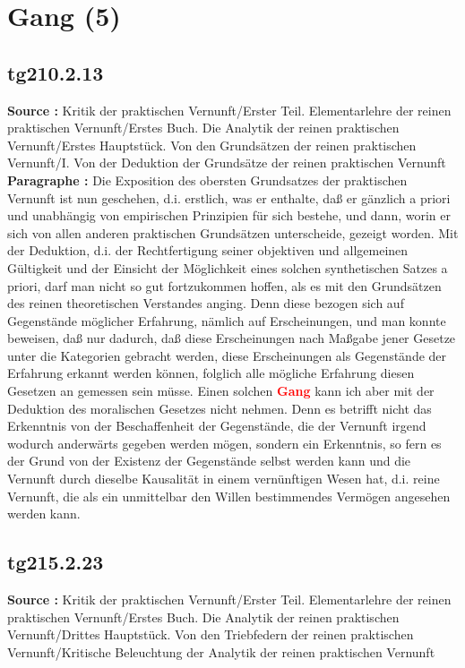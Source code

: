 \documentclass[a4paper,12pt,twoside]{book}
\newcommand{\match}[1]{\textcolor{red}{\textbf{#1}}}
\newcommand{\unnumberedsection}[1]{
	\section*{#1}
	\addcontentsline{toc}{section}{#1}
	\markright{#1}
}
\begin{document}
	\unnumberedsection{Gang (5)} 
	\subsection*{tg210.2.13} 
	\textbf{Source : }Kritik der praktischen Vernunft/Erster Teil. Elementarlehre der reinen praktischen Vernunft/Erstes Buch. Die Analytik der reinen praktischen Vernunft/Erstes Hauptstück. Von den Grundsätzen der reinen praktischen Vernunft/I. Von der Deduktion der Grundsätze der reinen praktischen Vernunft\\  
	
	\noindent\textbf{Paragraphe : }Die Exposition des obersten Grundsatzes der praktischen Vernunft ist nun geschehen, d.i. erstlich, was er enthalte, daß er gänzlich a priori und unabhängig von empirischen Prinzipien für sich bestehe, und dann, worin er sich von allen anderen praktischen Grundsätzen unterscheide, gezeigt worden. Mit der Deduktion, d.i. der Rechtfertigung seiner objektiven und allgemeinen Gültigkeit und der Einsicht der Möglichkeit eines solchen synthetischen Satzes a priori, darf man nicht so gut fortzukommen hoffen, als es mit den Grundsätzen des reinen theoretischen Verstandes anging. Denn diese bezogen sich auf Gegenstände möglicher Erfahrung, nämlich auf Erscheinungen, und man konnte beweisen, daß nur dadurch, daß diese Erscheinungen nach Maßgabe jener Gesetze unter die Kategorien gebracht werden, diese Erscheinungen als Gegenstände der Erfahrung erkannt werden können, folglich alle mögliche Erfahrung diesen Gesetzen an gemessen sein müsse. Einen solchen  \match{Gang} kann ich aber mit der Deduktion des moralischen Gesetzes nicht nehmen. Denn es betrifft nicht das Erkenntnis von der Beschaffenheit der Gegenstände, die der Vernunft irgend wodurch anderwärts gegeben werden mögen, sondern ein Erkenntnis, so fern es der Grund von der Existenz der Gegenstände selbst werden kann und die Vernunft durch dieselbe Kausalität in einem vernünftigen Wesen hat, d.i. reine Vernunft, die als ein unmittelbar den Willen bestimmendes Vermögen angesehen werden kann. 
	
	\subsection*{tg215.2.23} 
	\textbf{Source : }Kritik der praktischen Vernunft/Erster Teil. Elementarlehre der reinen praktischen Vernunft/Erstes Buch. Die Analytik der reinen praktischen Vernunft/Drittes Hauptstück. Von den Triebfedern der reinen praktischen Vernunft/Kritische Beleuchtung der Analytik der reinen praktischen Vernunft\\  
	
\end{document}
